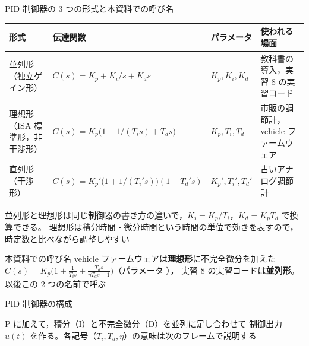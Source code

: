 \begin{frame}{PID 制御器の 3 つの形式と本資料での呼び名}
  \begin{table}
    \centering\scriptsize
    \renewcommand{\arraystretch}{1.15}
    \setlength{\tabcolsep}{4pt}
    \begin{tabular}{p{30mm}p{50mm}p{20mm}p{34mm}}
      \hline
      \textbf{形式} & \textbf{伝達関数} & \textbf{パラメータ} & \textbf{使われる場面} \\
      \hline
      並列形（独立ゲイン形） & $C(s)=K_p+K_i/s+K_d s$ & $K_p,K_i,K_d$ & 教科書の導入，実習 8 の実習コード \\
      理想形（ISA 標準形，非干渉形） & $C(s)=K_p\bigl(1+1/(T_i s)+T_d s\bigr)$ & $K_p,T_i,T_d$ & 市販の調節計，vehicle ファームウェア \\
      直列形（干渉形） & $C(s)=K_p'\bigl(1+1/(T_i' s)\bigr)(1+T_d' s)$ & $K_p',T_i',T_d'$ & 古いアナログ調節計 \\
      \hline
    \end{tabular}
  \end{table}

  {\scriptsize 並列形と理想形は同じ制御器の書き方の違いで，$K_i=K_p/T_i$，$K_d=K_p T_d$ で換算できる。
  理想形は積分時間・微分時間という時間の単位で効きを表すので，時定数と比べながら調整しやすい}

  \begin{block}{本資料での呼び名}
    \scriptsize vehicle ファームウェアは\textbf{理想形}に不完全微分を加えた
    $C(s)=K_p\bigl(1+\frac{1}{T_i s}+\frac{T_d s}{\eta T_d s+1}\bigr)$（パラメータ ），
    実習 8 の実習コードは\textbf{並列形}。以後この 2 つの名前で呼ぶ
  \end{block}
\end{frame}

\begin{frame}{PID 制御器の構成}
  \begin{center}
  \end{center}

  {\footnotesize P に加えて，積分（I）と不完全微分（D）を並列に足し合わせて
  制御出力 $u(t)$ を作る。各記号（$T_i,T_d,\eta$）の意味は次のフレームで説明する}
\end{frame}

